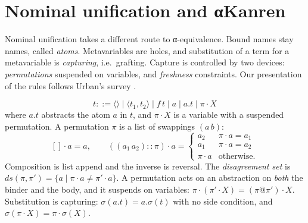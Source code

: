\section{Nominal unification and αKanren}\label{sec:lkanren-nominal}

Nominal unification \cite{UrbanPittsGabbay2004} takes a different route to α-equivalence. Bound names
stay names, called \emph{atoms}. Metavariables are holes, and substitution of a term for a
metavariable is \emph{capturing}, i.e.\ grafting. Capture is controlled by two devices:
\emph{permutations} suspended on variables, and \emph{freshness} constraints. Our presentation of the
rules follows Urban's survey \cite{Urban2010}.

\begin{definition}\label{def:lkanren-nominal}
\[
  t ::= \langle\rangle \mid \langle t_1,t_2\rangle \mid f\,t \mid a \mid a.t \mid \pi\cdot X
\]
where $a.t$ abstracts the atom $a$ in $t$, and $\pi\cdot X$ is a variable with a suspended
permutation. A permutation $\pi$ is a list of swappings $(a\,b)$:
\[
  []\cdot a=a,\qquad ((a_1\,a_2)::\pi)\cdot a=\begin{cases}a_2 & \pi\cdot a=a_1\\ a_1 & \pi\cdot a=a_2\\ \pi\cdot a&\text{otherwise.}\end{cases}
\]
Composition is list append and the inverse is reversal. The \emph{disagreement set} is
$ds(\pi,\pi')=\{a\mid \pi\cdot a\neq\pi'\cdot a\}$. A permutation acts on an abstraction on
\emph{both} the binder and the body, and it suspends on variables:
$\pi\cdot(\pi'\cdot X)=(\pi @ \pi')\cdot X$. Substitution is capturing: $\sigma(a.t)=a.\sigma(t)$ with
no side condition, and $\sigma(\pi\cdot X)=\pi\cdot\sigma(X)$.
\end{definition}

